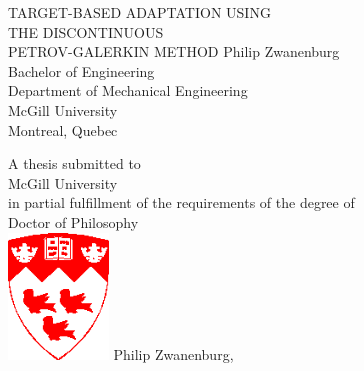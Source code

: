 \documentclass[12pt,Bold,letterpaper,TexShade]{mcgilletdclass}
\numberwithin{equation}{section}
\begin{document}
\begin{titlepage}
    \centering
    \large
    {\huge TARGET-BASED ADAPTATION USING \\ THE DISCONTINUOUS \\ \vspace{4mm} PETROV-GALERKIN METHOD}
    \vfill
    {\Large Philip Zwanenburg}\\
    Bachelor of Engineering\\
    \vfill
    Department of Mechanical Engineering\\
    McGill University\\
    Montreal, Quebec\\
    \vfill
    \date{\today}
    \vfill
    A thesis submitted to\\McGill University\\in partial fulfillment of the requirements of the degree of\\Doctor of Philosophy\\
    \vfill
    \includegraphics[width=0.2\textwidth]{./figures/McGillcrest.eps}
    \vfill
    {\normalsize \textcopyright\hspace{1mm}Philip Zwanenburg, \the\year}\\
    \vfill
    \vfill
\end{titlepage}

\end{document}

